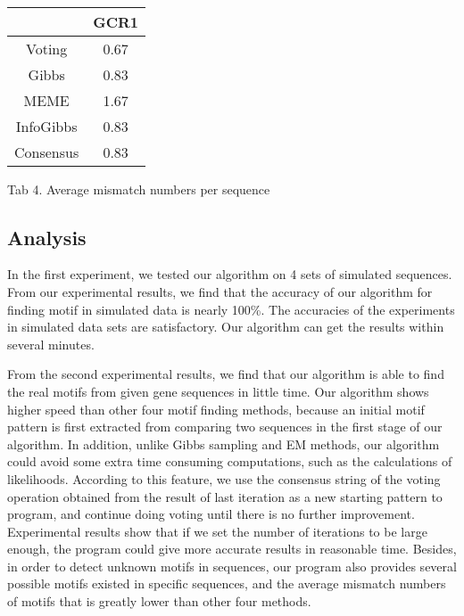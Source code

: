 \documentclass[11pt]{article}
\begin{document}
\
\begin{center}
\begin{tabular}{|c|c|}
\hline &GCR1\\ [0.5ex] \hline
Voting& 0.67\\
Gibbs& 0.83\\
MEME& 1.67\\
InfoGibbs& 0.83\\
Consensus& 0.83\\
\hline
\end{tabular}
\end{center}

\begin{center}
Tab 4. Average mismatch numbers per sequence
\end{center}

\subsection{Analysis}
In the first experiment, we tested our algorithm on 4 sets of
simulated sequences. From our experimental results, we find that the
accuracy of our algorithm for finding motif in simulated data is
nearly 100\%. The accuracies of the experiments in simulated data
sets are satisfactory. Our algorithm can get the results within
several minutes.

From the second experimental results, we find that our  algorithm is
able to find the real motifs from given gene sequences in little
time. Our algorithm shows higher speed than other four motif finding
methods, because an initial motif pattern is first extracted from
comparing two sequences in the first stage of our algorithm. In
addition, unlike Gibbs sampling and EM methods, our algorithm could
avoid some extra time consuming computations, such as the
calculations of likelihoods. According to this feature, we use the
consensus string of the voting operation obtained from the result of
last iteration as a new starting pattern to program, and continue
doing voting until there is no further improvement. Experimental
results show that if we set the number of iterations to be large
enough, the program could give more accurate results in reasonable
time. Besides, in order to detect unknown motifs in sequences, our
program also provides several possible motifs existed in specific
sequences, and the average mismatch numbers of motifs that is
greatly lower than other four methods.
\end{document}
